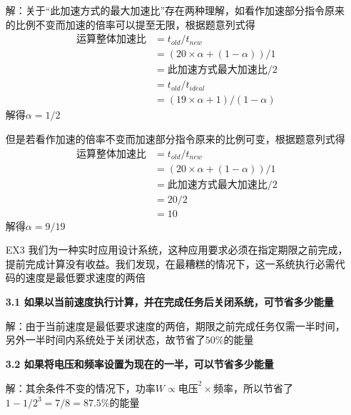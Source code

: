 \documentclass[12pt,a4paper,utf8]{ctexart}
\begin{document}
\begin{enumerate}
解：关于“此加速方式的最大加速比”存在两种理解，如看作加速部分指令原来的比例不变而加速的倍率可以提至无限，根据题意列式得
\begin{equation}
	\begin{aligned}
		\mbox{运算整体加速比}		&= t_{old} / t_{new} \\
								&= (20 \times \alpha + (1 - \alpha)) / 1 \\
								&= \mbox{此加速方式最大加速比} \bigg / 2 \\
								&= t_{old} / t_{ideal} \\
								&= (19\times \alpha + 1) / (1 - \alpha )
	\end{aligned}
	\nonumber
\end{equation}
解得$\alpha = 1/2$

但是若看作加速的倍率不变而加速部分指令原来的比例可变，根据题意列式得
\begin{equation}
	\begin{aligned}
		\mbox{运算整体加速比}		&= t_{old} / t_{new} \\
		&= (20 \times \alpha + (1 - \alpha)) / 1 \\
		&= \mbox{此加速方式最大加速比} \bigg / 2 \\
		&= 20 / 2 \\
		&= 10
	\end{aligned}
	\nonumber
\end{equation}
解得$\alpha = 9/19$

\item[EX3] %
我们为一种实时应用设计系统，这种应用要求必须在指定期限之前完成，提前完成计算没有收益。我们发现，在最糟糕的情况下，这一系统执行必需代码的速度是最低要求速度的两倍

\textbf{3.1 如果以当前速度执行计算，并在完成任务后关闭系统，可节省多少能量}

解：由于当前速度是最低要求速度的两倍，期限之前完成任务仅需一半时间，另外一半时间内系统处于关闭状态，故节省了$50\%$的能量

\textbf{3.2 如果将电压和频率设置为现在的一半，可以节省多少能量}

解：其余条件不变的情况下，功率$W\propto \mbox{电压}^2 \times \mbox{频率}$，所以节省了$1-1/2^3 = 7/8 = 87.5\%$的能量


\end{enumerate}
\end{document}
